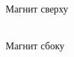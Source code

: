 \documentclass[12pt,a4paper]{article}
\begin{document}
\begin{figure}[H]
\begin{minipage}[h]{0.45\linewidth}
 Магнит сверху \\
\end{minipage}
\hfill
\begin{minipage}[h]{0.45\linewidth}
 \\ Магнит сбоку
\end{minipage}
\end{figure}
\end{document}
